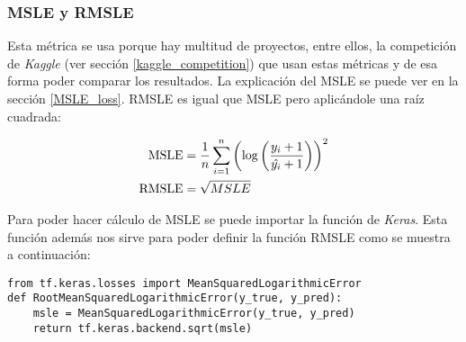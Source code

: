 \subsubsection{MSLE y RMSLE}

Esta métrica se usa porque hay multitud de proyectos, entre ellos, la competición de \textit{Kaggle} (ver sección \ref{kaggle_competition}) que usan estas métricas y de esa forma poder comparar los resultados. La explicación del MSLE se puede ver en la sección \ref{MSLE_loss}. RMSLE es igual que MSLE pero aplicándole una raíz cuadrada:

\begin{equation}
\centering
    \begin{split}
        \text{MSLE} &= \frac{1}{n} \sum_{i=1}^n \left(\log{\left(\frac{y_i + 1}{\hat{y_i} + 1}\right)}\right)^2 \\
        \text{RMSLE} &= \sqrt{MSLE}
    \end{split}
\end{equation}

Para poder hacer cálculo de MSLE se puede importar la función de \textit{Keras}. Esta función además nos sirve para poder definir la función RMSLE como se muestra a continuación:

\begin{verbatim}
from tf.keras.losses import MeanSquaredLogarithmicError
def RootMeanSquaredLogarithmicError(y_true, y_pred):
    msle = MeanSquaredLogarithmicError(y_true, y_pred)
    return tf.keras.backend.sqrt(msle)
\end{verbatim}